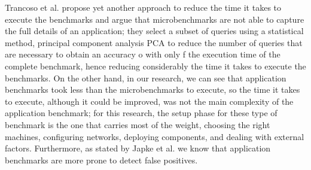 Trancoso et al. \cite{trancoso2005reducingTPC} propose yet another approach to reduce the time it takes to execute the benchmarks and argue that microbenchmarks are not able to capture the full details of an application; they select a subset of queries using a statistical method, principal component analysis \ac{PCA} to reduce the number of queries that are necessary to obtain an accuracy o  with only  f the execution time of the complete benchmark, hence reducing considerably the time it takes to execute the benchmarks. On the other hand, in our research, we can see that application benchmarks took less than the microbenchmarks to execute, so the time it takes to execute, although it could be improved, was not the main complexity of the application benchmark; for this research, the setup phase for these type of benchmark is the one that carries most of the weight, choosing the right machines, configuring networks, deploying components, and dealing with external factors. Furthermore, as stated by Japke et al. \cite{japke2023earlymicrobenchmarkcatches} we know that application benchmarks are more prone to detect false positives.  

